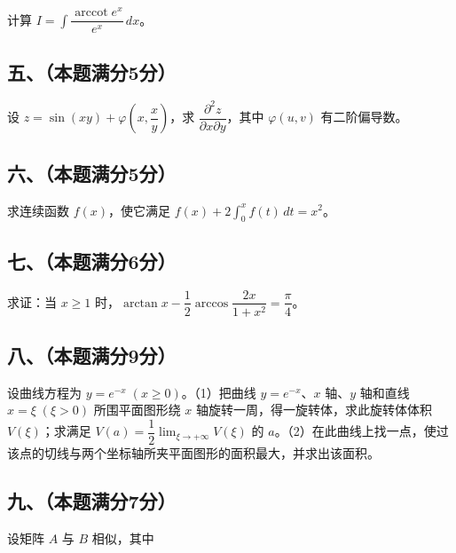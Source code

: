 \documentclass[UTF8,12pt]{ctexart}
\begin{document}
计算 \(\displaystyle I=\displaystyle \int\dfrac{\displaystyle \operatorname{arccot}e^x}{\displaystyle e^x}\,dx\)。


\subsection*{五、（本题满分5分）}

设 \(\displaystyle z=\sin(xy)+\varphi(x,\allowbreak \dfrac{\displaystyle x}{\displaystyle y})\)，求 \(\displaystyle \dfrac{\displaystyle \partial^2z}{\displaystyle \partial x\partial y}\)，其中 \(\displaystyle \varphi(u,\allowbreak v)\) 有二阶偏导数。


\subsection*{六、（本题满分5分）}

求连续函数 \(\displaystyle f(x)\)，使它满足 \(\displaystyle f(x)+2\displaystyle \int_0^x f(t)\,dt=x^2\)。


\subsection*{七、（本题满分6分）}

求证：当 \(\displaystyle x\ge1\) 时，\(\displaystyle \arctan x-\dfrac{\displaystyle 1}{\displaystyle 2}\arccos\dfrac{\displaystyle 2x}{\displaystyle 1+x^2}=\dfrac{\displaystyle \pi}{\displaystyle 4}\)。


\subsection*{八、（本题满分9分）}

设曲线方程为 \(\displaystyle y=e^{-x}\;(x\ge0)\)。（1）把曲线 \(\displaystyle y=e^{-x}\)、\(\displaystyle x\) 轴、\(\displaystyle y\) 轴和直线 \(\displaystyle x=\xi\;(\xi>0)\) 所围平面图形绕 \(\displaystyle x\) 轴旋转一周，得一旋转体，求此旋转体体积 \(\displaystyle V(\xi)\)；求满足 \(\displaystyle V(a)=\dfrac{\displaystyle 1}{\displaystyle 2}\displaystyle \lim_{\xi\to+\infty}V(\xi)\) 的 \(\displaystyle a\)。（2）在此曲线上找一点，使过该点的切线与两个坐标轴所夹平面图形的面积最大，并求出该面积。


\subsection*{九、（本题满分7分）}

设矩阵 \(\displaystyle A\) 与 \(\displaystyle B\) 相似，其中
\end{document}
